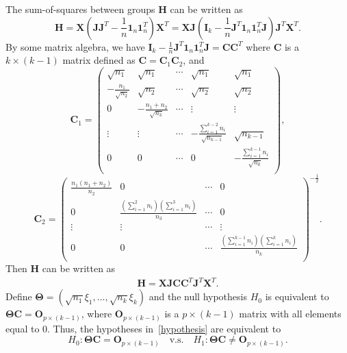 \documentclass[12pt]{article} %
\newcommand{\bX}{\mathbf{X}}
\newcommand{\bH}{\mathbf{H}}
\newcommand{\bJ}{\mathbf{J}}
\newcommand{\bC}{\mathbf{C}}
\newcommand{\bO}{\mathbf{O}}
\newcommand{\bI}{\mathbf{I}}
\newcommand{\bfsym}[1]{\ensuremath{\boldsymbol{#1}}}
\def\bTheta {\bfsym {\Theta}}
\theoremstyle{definition}
\begin{document}
The sum-of-squares between groups $\bH$ can be written as
$$
        \bH=\bX(\bJ\bJ^T-\frac{1}{n}\mathbf{1}_n\mathbf{1}_n^T)\bX^T
=\bX \bJ(\bI_k-\frac{1}{n}\bJ^T\mathbf{1}_n \mathbf{1}_n^T \bJ)\bJ^T \bX^T.
$$
By some matrix algebra, we have $\bI_k-\frac{1}{n}\bJ^T\mathbf{1}_n \mathbf{1}_n^T \bJ=\bC\bC^T$
where $\bC$ is a $k\times (k-1)$ matrix defined as $\bC=\bC_1\bC_2$, and
 $$
\bC_1=\begin{pmatrix}
    \sqrt{n_1}&\sqrt{n_1}&\cdots&\sqrt{n_1}&\sqrt{n_1}\\
    -\frac{n_1}{\sqrt{n_2}}&\sqrt{n_2}&\cdots&\sqrt{n_2}&\sqrt{n_2}\\
    0&-\frac{n_1+n_2}{\sqrt{n_3}}&\cdots&\vdots&\vdots\\
    \vdots&\vdots&\cdots&-\frac{\sum_{i=1}^{k-2}n_i}{\sqrt{n_{k-1}}}&\sqrt{n_{k-1}}\\
    0&0&\cdots&0&-\frac{\sum_{i=1}^{k-1}n_i}{\sqrt{n_k}}\\
\end{pmatrix},
 $$
 $$
\bC_2=\begin{pmatrix}
    \frac{n_1(n_1+n_2)}{n_2}&0&\cdots&0\\
    0&\frac{(\sum_{i=1}^2 n_i)(\sum_{i=1}^3 n_i)}{n_3}&\cdots&0\\
    \vdots&\vdots&\cdots&\vdots\\
    0&0&\cdots&\frac{(\sum_{i=1}^{k-1} n_i)(\sum_{i=1}^k n_i)}{n_{k}}\\
\end{pmatrix}^{-\frac{1}{2}}.
$$
Then $\bH$ can be written as
\begin{equation*}
    \begin{aligned}
        \bH=\bX \bJ\bC \bC^T \bJ^T \bX^T.
    \end{aligned}
\end{equation*}
 Define $\bTheta=(\sqrt{n_1}\xi_1,\ldots,\sqrt{n_k}\xi_k)$
 and the null hypothesis $H_0$ is equivalent to $\bTheta \bC=\bO_{p\times (k-1)}$, where $\bO_{p\times (k-1)}$ is a $p\times (k-1)$ matrix with all elements equal to $0$.
 Thus, the hypotheses in~\eqref{hypothesis} are equivalent to
 $$
 H_0:\bTheta \bC=\bO_{p\times (k-1)}\quad \text{v.s.}\quad H_1: \bTheta \bC\neq \bO_{p\times (k-1)}.
 $$
\end{document}
